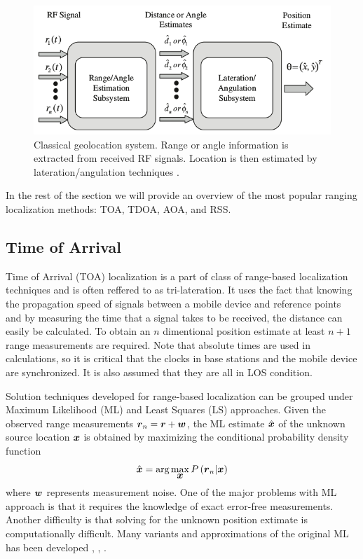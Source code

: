 \begin{figure}[h]
\centering
\includegraphics[width=1.0\textwidth]{figures/localization_example.png}
\caption{Classical geolocation system. Range or angle information is extracted from received RF signals. Location is then estimated by lateration/angulation techniques \cite{GeoLoc}.}
\label{fig:2step}
\end{figure}


In the rest of the section we will provide an overview of the most popular ranging localization methods: TOA, TDOA, AOA, and RSS.



\subsection{Time of Arrival }

Time of Arrival (TOA) localization is a part of class of range-based localization techniques and is often reffered to as tri-lateration. It uses the fact that knowing the propagation speed of  signals between a mobile device and reference points and by measuring the time that a signal takes to be received, the distance can easily be calculated. To obtain an $n$  dimentional position estimate at least $n+1$ range measurements are required. Note that absolute times are used in calculations, so it is critical that the  clocks in base stations and the mobile device are synchronized. It is also assumed that they are all in LOS condition. %

Solution techniques developed for range-based localization can be grouped under Maximum Likelihood (ML) and Least Squares (LS) approaches. 
Given the observed range measurements $\mbox{\boldmath$r$}_n = \mbox{\boldmath$r$} + \mbox{\boldmath$w$}$, the ML estimate $\hat{\mbox{\boldmath$x$}}$ of the unknown source location $\mbox{\boldmath$x$}$ is obtained by maximizing the conditional probability density function 
\begin{equation}
\nonumber
\hat{\mbox{\boldmath$x$}} = \mbox{arg}\max_{\mbox{\boldmath$x$}} P\left(\mbox{\boldmath$r$}_n|\mbox{\boldmath$x$}\right)
\end{equation}
where $\mbox{\boldmath$w$}$ represents measurement noise. One of the major problems with ML approach is that it requires the knowledge of exact error-free measurements. Another difficulty is that solving for the unknown position extimate is computationally difficult. Many variants and approximations of the original ML has been  developed \cite{Guvenc}, \cite{Guvenc2}, \cite{HoML}.

